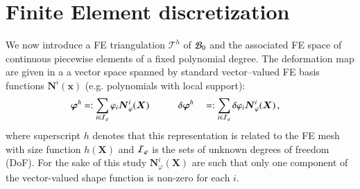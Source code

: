 \documentclass[preprint,12pt,times]{elsarticle}
\def\gz  #1{           \mbox{$\boldsymbol{#1}$}}
\def\mcl  #1{               {\cal #1}}
\begin{document}
\section{Finite Element discretization}
\label{sec:fe}

We now introduce a FE triangulation $\mathcal{T}^h$ of $\mcl B_0$ and
the associated FE space of continuous piecewise elements of a fixed polynomial degree. %
The deformation map are given in a
a vector space spanned by standard vector--valued FE basis functions $\gz N^i(\gz x)$ (e.g. polynomials with local support):
\begin{alignat}{2}
       \gz \varphi^h &=:  \sum_{i \in \mcl I_\varphi}       \varphi_i \gz N^i_\varphi (\gz X) \quad \quad \quad
\delta \gz \varphi^h &&=: \sum_{i \in \mcl I_\varphi} \delta \varphi_i \gz N^i_\varphi (\gz X) \,,
\end{alignat}
where superscript $h$ denotes that this representation is related to the FE mesh with size function $h(\gz X)$ and $\mcl I_\varphi$ is the sets of unknown degrees of freedom (DoF).
For the sake of this study $\gz N^i_\varphi (\gz X)$ are such that only one component of the vector-valued shape function is non-zero for each $i$.
\end{document}

